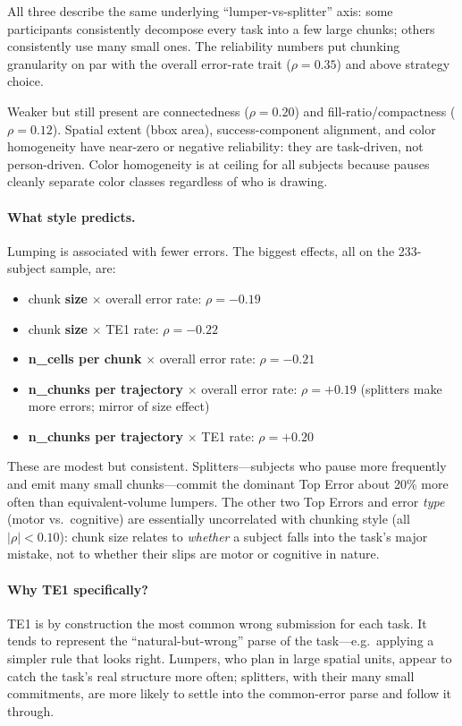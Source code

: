 \documentclass[11pt]{article}
\begin{document}
All three describe the same underlying ``lumper-vs-splitter'' axis:
some participants consistently decompose every task into a few large
chunks; others consistently use many small ones. The reliability
numbers put chunking granularity on par with the overall error-rate
trait ($\rho = 0.35$) and above strategy choice.

Weaker but still present are connectedness ($\rho = 0.20$) and
fill-ratio/compactness ($\rho = 0.12$). Spatial extent (bbox area),
success-component alignment, and color homogeneity have near-zero or
negative reliability: they are task-driven, not person-driven. Color
homogeneity is at ceiling for all subjects because pauses cleanly
separate color classes regardless of who is drawing.

\paragraph{What style predicts.} Lumping is associated with fewer
errors. The biggest effects, all on the 233-subject sample, are:

\begin{itemize}
  \item chunk \textbf{size} $\times$ overall error rate: $\rho = -0.19$
  \item chunk \textbf{size} $\times$ TE1 rate: $\rho = -0.22$
  \item \textbf{n\_cells per chunk} $\times$ overall error rate:
    $\rho = -0.21$
  \item \textbf{n\_chunks per trajectory} $\times$ overall error rate:
    $\rho = +0.19$ (splitters make more errors; mirror of size effect)
  \item \textbf{n\_chunks per trajectory} $\times$ TE1 rate: $\rho = +0.20$
\end{itemize}

These are modest but consistent. Splitters---subjects who pause more
frequently and emit many small chunks---commit the dominant Top Error
about 20\% more often than equivalent-volume lumpers. The other two
Top Errors and error \emph{type} (motor vs.\ cognitive) are essentially
uncorrelated with chunking style (all $|\rho| < 0.10$): chunk size
relates to \emph{whether} a subject falls into the task's major
mistake, not to whether their slips are motor or cognitive in nature.

\paragraph{Why TE1 specifically?} TE1 is by construction the most
common wrong submission for each task. It tends to represent the
``natural-but-wrong'' parse of the task---e.g.\ applying a simpler rule
that looks right. Lumpers, who plan in large spatial units, appear to
catch the task's real structure more often; splitters, with their
many small commitments, are more likely to settle into the common-error
parse and follow it through.
\end{document}
